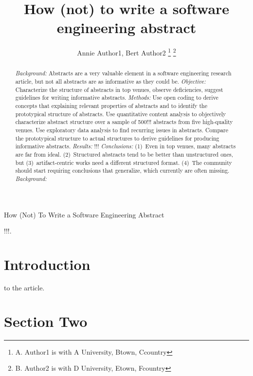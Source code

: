 \documentclass[journal]{IEEEtran}
\begin{document}
	
\title{How (not) to write a software engineering abstract}
\author{Annie Author1, Bert Author2
\thanks{A. Author1 is with A University, Btown, Ccountry}
\thanks{B. Author2 is with D University, Etown, Fcountry}}

%
{How (Not) To Write a Software Engineering Abstract}

\maketitle

\begin{abstract}  %
\emph{Background:}
Abstracts are a very valuable element in a software engineering research article,
but not all abstracts are as informative as they could be.
\emph{Objective:} 
Characterize the structure of abstracts in top venues, 
observe deficiencies, 
suggest guidelines for writing informative abstracts.
\emph{Methods:}
Use open coding to derive concepts that explaining relevant properties of abstracts
and to identify the prototypical structure of abstracts.
Use quantitative content analysis to objectively characterize abstract structure
over a sample of 500!!! abstracts from five high-quality venues.
Use exploratory data analysis to find recurring issues in abstracts.
Compare the prototypical structure to actual structures to derive
guidelines for producing informative abstracts.
\emph{Results:}
!!!
\emph{Conclusions:}
(1)~Even in top venues, many abstracts are far from ideal.
(2)~Structured abstracts tend to be better than unstructured ones, 
but (3)~artifact-centric works need a different structured format.
(4)~The community should start requiring conclusions that generalize, 
which currently are often missing.
\emph{Background:}

\end{abstract}

\begin{IEEEkeywords}
!!!.
\end{IEEEkeywords}


\section{Introduction}
 to the article.




\section{Section Two}
\end{document}
